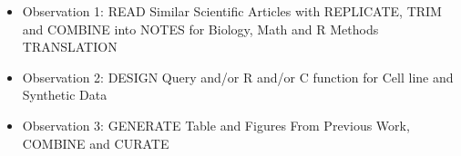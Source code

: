 \begin{itemize}
	\item Observation 1: READ Similar Scientific Articles with REPLICATE, TRIM and COMBINE into NOTES for Biology, Math and R Methods TRANSLATION \\
	\item Observation 2: DESIGN Query and/or R and/or C function for Cell line and Synthetic Data\\
	\item Observation 3: GENERATE Table and Figures From Previous Work, COMBINE and CURATE\\
\end{itemize}	

